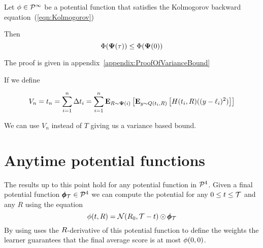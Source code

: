 \documentclass{article}[12pt]
\begin{document}
\iffalse
Our characterization applies to the limit where the $s_i$ are small. Formally, we define
\begin{definition}
We say that an instance of the discrete time game is
$(n,s,\tau)$-bounded if it consists of $n$ iterations and $\forall\;\; 0<i\leq n,\;\; s_i < s$ and $\sum_{j=1}^n s_j^2=\tau$
\end{definition}

Note that $\tau>t_n$ and that $\tau$ depends only on the ranges $s_i$
while $t_n$ depends on the variance. $t_n = T$ 
is the dominant term in the regret bound, while $\tau$ controls the
error term.

\fi

\begin{theorem} \label{thm:variancebound} Let $\phi \in {\cal P}^{\infty}$
  be a potential function that satisfies the Kolmogorov backward
  equation~(\ref{eqn:Kolmogorov})

Then 
$$\Phi({\bf \Psi}(\tau)) \leq \Phi({\bf \Psi}(0))$$
\end{theorem}

The proof is given in appendix~\ref{appendix:ProofOfVarianceBound}

If we define

\begin{equation} \label{eqn:Vn}
  V_n = t_n = \sum_{i=1}^n \Delta t_i= 
  \sum_{i=1}^n {\bf E}_{R \sim {\bf \Psi}(i)}\left[ {\bf E}_{y \sim Q(t_i,R)}\left[ H(t_i,R) ((y-\ell_i)^2) \right] \right]
\end{equation}

We can use $V_n$ instead of $T$ giving us a variance based bound.

  

\section{Anytime potential functions}

The results up to this point hold for any potential function in
${\cal P}^{4}$. Given a final potential function $\pmb{\phi}_{\mathcal{T}} \in {\cal P}^{4}$ we
can compute the potential for any $0 \leq t \leq \mathcal{T}$ and any $R$ using the equation 
\begin{equation} \label{eqn:convol-with-normal}
\phi(t,R)={\cal N}(R_0,\mathcal{T}-t) \odot \pmb{\phi}_{\mathcal{T}}
\end{equation}
By using uses the $R$-derivative of this potential function to define
the weights the learner guarantees that the final average score is at
most $\phi(0,0)$.
\end{document}
